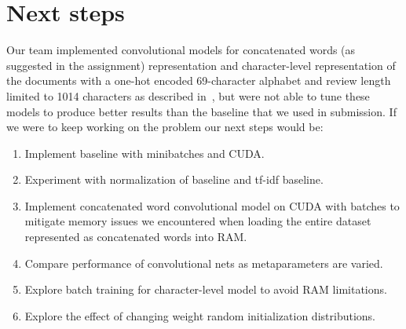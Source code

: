\documentclass{article} %
\begin{document}

\section{Next steps}
\label{next}
Our team implemented convolutional models for concatenated words (as suggested in the assignment) representation and character-level representation of the documents with a one-hot encoded 69-character alphabet and review length limited to 1014 characters as described in~\cite{zhang15}, but were not able to tune these models to produce better results than the baseline that we used in submission.
If we were to keep working on the problem our next steps would be:
\begin{enumerate}
\item Implement baseline with minibatches and CUDA.
\item Experiment with normalization of baseline and tf-idf baseline.
\item Implement concatenated word convolutional model on CUDA with batches to mitigate memory issues we encountered when loading 
the entire dataset represented as concatenated words into RAM.
\item Compare performance of convolutional nets as metaparameters are varied.
\item Explore batch training for character-level model to avoid RAM limitations.
\item Explore the effect of changing weight random initialization distributions.
\end{enumerate}

{}

\end{document}
